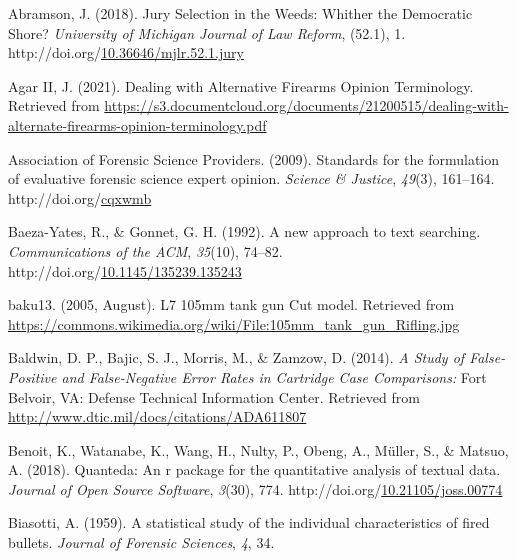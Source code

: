\documentclass[print]{nuthesis}
\newlength{\cslhangindent}
\newenvironment{CSLReferences}[2]%
{\setlength{\parindent}{0pt}%
\everypar{\setlength{\hangindent}{\cslhangindent}}\ignorespaces}%
{\par}
\begin{document}
\hypertarget{refs}{}
\begin{CSLReferences}{1}{0}
\leavevmode{}%
Abramson, J. (2018). Jury {Selection} in the {Weeds}: {Whither} the {Democratic} {Shore}? \emph{University of Michigan Journal of Law Reform}, (52.1), 1. http://doi.org/\href{https://doi.org/10.36646/mjlr.52.1.jury}{10.36646/mjlr.52.1.jury}

\leavevmode{}%
Agar II, J. (2021). Dealing with {Alternative} {Firearms} {Opinion} {Terminology}. Retrieved from \url{https://s3.documentcloud.org/documents/21200515/dealing-with-alternate-firearms-opinion-terminology.pdf}

\leavevmode{}%
Association of Forensic Science Providers. (2009). Standards for the formulation of evaluative forensic science expert opinion. \emph{Science \& Justice}, \emph{49}(3), 161--164. http://doi.org/\href{https://doi.org/cqxwmb}{cqxwmb}

\leavevmode{}%
Baeza-Yates, R., \& Gonnet, G. H. (1992). A new approach to text searching. \emph{Communications of the ACM}, \emph{35}(10), 74--82. http://doi.org/\href{https://doi.org/10.1145/135239.135243}{10.1145/135239.135243}

\leavevmode{}%
baku13. (2005, August). L7 105mm tank gun {Cut} model. Retrieved from \url{https://commons.wikimedia.org/wiki/File:105mm_tank_gun_Rifling.jpg}

\leavevmode{}%
Baldwin, D. P., Bajic, S. J., Morris, M., \& Zamzow, D. (2014). \emph{A {Study} of {False}-{Positive} and {False}-{Negative} {Error} {Rates} in {Cartridge} {Case} {Comparisons}:} Fort Belvoir, VA: Defense Technical Information Center. Retrieved from \url{http://www.dtic.mil/docs/citations/ADA611807}

\leavevmode{}%
Benoit, K., Watanabe, K., Wang, H., Nulty, P., Obeng, A., Müller, S., \& Matsuo, A. (2018). Quanteda: An r package for the quantitative analysis of textual data. \emph{Journal of Open Source Software}, \emph{3}(30), 774. http://doi.org/\href{https://doi.org/10.21105/joss.00774}{10.21105/joss.00774}

\leavevmode{}%
Biasotti, A. (1959). A statistical study of the individual characteristics of fired bullets. \emph{Journal of Forensic Sciences}, \emph{4}, 34.


\end{CSLReferences}
\end{document}

